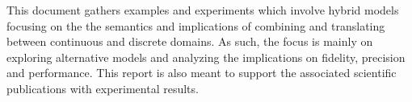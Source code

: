 This document gathers examples and experiments which involve hybrid models focusing on the the semantics and implications of combining and translating between continuous and discrete domains. As such, the focus is mainly on exploring alternative models and analyzing the implications on fidelity, precision and performance. This report is also meant to support the associated scientific publications with experimental results.